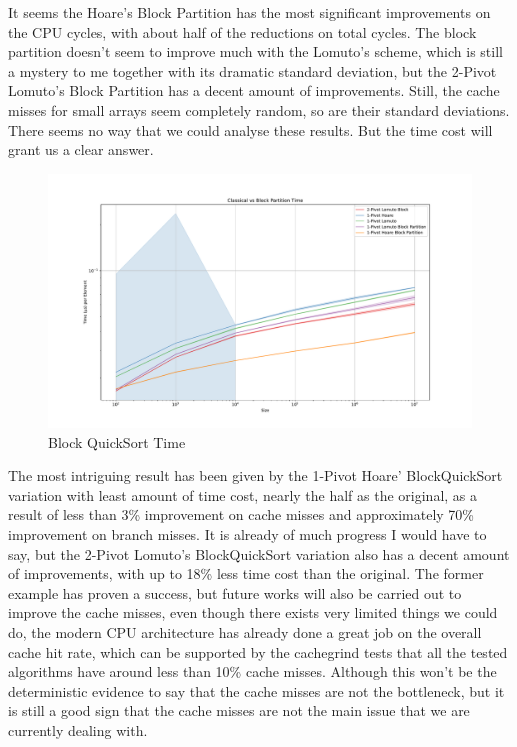 \documentclass[a4paper,oneside,12pt]{book}
\begin{document}
It seems the Hoare's Block Partition has the most significant improvements on the CPU cycles, with about half of the reductions on total cycles.
The block partition doesn't seem to improve much with the Lomuto's scheme, which is still a mystery to me together with its dramatic standard deviation, but the 2-Pivot Lomuto's Block Partition has a decent amount of improvements.
Still, the cache misses for small arrays seem completely random, so are their standard deviations. There seems no way that we could analyse these results. But the time cost will grant us a clear answer.

\begin{figure}[H]
    \hypertarget{fig:blocktime}{}
    \caption{Block QuickSort Time}
    \centering
    \hspace*{-0.27\textwidth}
    \includegraphics[width=1.5\textwidth]{Classical vs Block Partition Time.pdf}
\end{figure}

The most intriguing result has been given by the 1-Pivot Hoare' BlockQuickSort variation with least amount of time cost, nearly the half as the original, as a result of less than 3\% improvement on cache misses and approximately 70\% improvement on branch misses.
It is already of much progress I would have to say, but the 2-Pivot Lomuto's BlockQuickSort variation also has a decent amount of improvements, with up to 18\% less time cost than the original.
The former example has proven a success, but future works will also be carried out to improve the cache misses, even though there exists very limited things we could do,
the modern CPU architecture has already done a great job on the overall cache hit rate, which can be supported by the cachegrind tests that all the tested algorithms have around less than 10\% cache misses.
Although this won't be the deterministic evidence to say that the cache misses are not the bottleneck, but it is still a good sign that the cache misses are not the main issue that we are currently dealing with.
\end{document}
